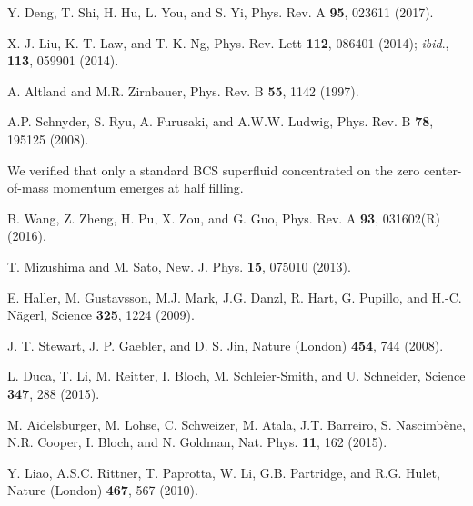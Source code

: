 \documentclass[twocolumn,prl,superscriptaddress,amsmath,amssymb]{revtex4} %
\begin{document}
\begin{thebibliography}{10}
 Y. Deng, T. Shi, H. Hu, L. You, and S. Yi, Phys. Rev. A {\bf 95}, 023611 (2017).

 X.-J. Liu, K. T. Law, and T. K. Ng, Phys. Rev. Lett {\bf112}, 086401 (2014); {\it ibid}., {\bf113}, 059901 (2014).

 A. Altland and M.R. Zirnbauer, Phys. Rev. B {\bf55}, 1142 (1997).

 A.P. Schnyder, S. Ryu, A. Furusaki, and A.W.W. Ludwig, Phys. Rev. B {\bf78}, 195125 (2008).




 We verified that only a standard BCS superfluid concentrated on the zero center-of-mass momentum emerges at half filling.

 B. Wang, Z. Zheng, H. Pu, X. Zou, and G. Guo, Phys. Rev. A {\bf93}, 031602(R) (2016).

 T. Mizushima and M. Sato, New. J. Phys. {\bf{15}}, 075010 (2013).

 E. Haller, M. Gustavsson, M.J. Mark, J.G. Danzl, R. Hart, G. Pupillo, and H.-C. N\"{a}gerl, Science {\bf{325}}, 1224 (2009).

 J. T. Stewart, J. P. Gaebler, and D. S. Jin, Nature (London) {\bf454}, 744 (2008).

 L. Duca, T. Li, M. Reitter, I. Bloch, M. Schleier-Smith, and U. Schneider, Science {\bf347}, 288 (2015).

 M. Aidelsburger, M. Lohse, C. Schweizer, M. Atala, J.T. Barreiro, S. Nascimb\`{e}ne, N.R. Cooper, I. Bloch, and N. Goldman, Nat. Phys. {\bf 11}, 162 (2015).

 Y. Liao, A.S.C. Rittner, T. Paprotta, W. Li, G.B. Partridge, and R.G. Hulet, Nature (London) {\bf467}, 567 (2010).


\end{thebibliography}
\end{document}
